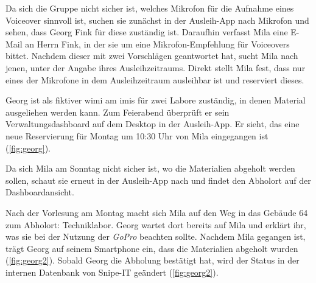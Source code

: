 Da sich die Gruppe nicht sicher ist, welches Mikrofon für die Aufnahme eines
Voiceover sinnvoll ist, suchen sie zunächst in der Ausleih-App nach Mikrofon und
sehen, dass Georg Fink für diese zuständig ist. Daraufhin verfasst Mila eine
E-Mail an Herrn Fink, in der sie um eine Mikrofon-Empfehlung für Voiceovers
bittet. Nachdem dieser mit zwei Vorschlägen geantwortet hat, sucht Mila nach
jenen, unter der Angabe ihres Ausleihzeitraums.  Direkt stellt Mila fest, dass
nur eines der Mikrofone in dem Ausleihzeitraum ausleihbar ist und reserviert
dieses.

Georg ist als fiktiver \ac{wimi} am \ac{imis} für zwei Labore zuständig, in
denen Material ausgeliehen werden kann. Zum Feierabend überprüft er sein
Verwaltungsdashboard auf dem Desktop in der Ausleih-App. Er sieht, das eine neue
Reservierung für Montag um 10:30 Uhr von Mila eingegangen ist (\ref{fig:georg}).

Da sich Mila am Sonntag nicht sicher ist, wo die Materialien abgeholt werden
sollen, schaut sie erneut in der Ausleih-App nach und findet den Abholort auf
der Dashboardansicht.

Nach der Vorlesung am Montag macht sich Mila auf den Weg in das Gebäude 64 zum
Abholort: Techniklabor. Georg wartet dort bereits auf Mila und erklärt ihr, was
sie bei der Nutzung der \textit{GoPro} beachten sollte. Nachdem Mila gegangen ist, trägt
Georg auf seinem Smartphone ein, dass die Materialien abgeholt wurden (\ref{fig:georg2}). Sobald
Georg die Abholung bestätigt hat, wird der Status in der internen Datenbank von
Snipe-IT geändert (\ref{fig:georg2}).

